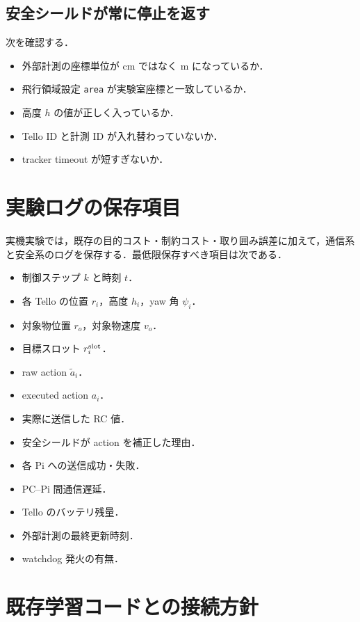 \subsection{安全シールドが常に停止を返す}

次を確認する．

\begin{itemize}
  \item 外部計測の座標単位が cm ではなく m になっているか．
  \item 飛行領域設定 \texttt{area} が実験室座標と一致しているか．
  \item 高度 $h$ の値が正しく入っているか．
  \item Tello ID と計測 ID が入れ替わっていないか．
  \item tracker timeout が短すぎないか．
\end{itemize}

\section{実験ログの保存項目}
\label{sec:logs}

実機実験では，既存の目的コスト・制約コスト・取り囲み誤差に加えて，通信系と安全系のログを保存する．最低限保存すべき項目は次である．

\begin{itemize}
  \item 制御ステップ $k$ と時刻 $t$．
  \item 各 Tello の位置 $r_i$，高度 $h_i$，yaw 角 $\psi_i$．
  \item 対象物位置 $r_o$，対象物速度 $v_o$．
  \item 目標スロット $r_i^{\rm slot}$．
  \item raw action $\tilde a_i$．
  \item executed action $a_i$．
  \item 実際に送信した RC 値．
  \item 安全シールドが action を補正した理由．
  \item 各 Pi への送信成功・失敗．
  \item PC--Pi 間通信遅延．
  \item Tello のバッテリ残量．
  \item 外部計測の最終更新時刻．
  \item watchdog 発火の有無．
\end{itemize}

\section{既存学習コードとの接続方針}
\label{sec:connection_to_existing_rl}

